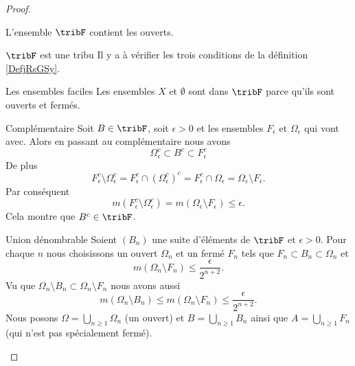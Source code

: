 \begin{proof}
\begin{subproof}
                L'ensemble \( \tribF\) contient les ouverts.

            \item[\( \tribF\) est une tribu]
                Il y a à vérifier les trois conditions de la définition \ref{DefjRsGSy}.
                \begin{subproof}
                \item[Les ensembles faciles]
                    Les ensembles \( X\) et \( \emptyset\) sont dans \( \tribF\) parce qu'ils sont ouverts et fermés.
                \item[Complémentaire]
                    Soit \( B\in \tribF\), soit \( \epsilon>0\) et les ensembles \( F_{\epsilon} \) et \( \Omega_{\epsilon}\) qui vont avec. Alors en passant au complémentaire nous avons
                    \begin{equation}
                        \Omega_{\epsilon}^c\subset B^c\subset F_{\epsilon}^c
                    \end{equation}
                    De plus
                    \begin{equation}
                        F_{\epsilon}^c\setminus \Omega_{\epsilon}^c=F_{\epsilon}^c\cap(\Omega_{\epsilon}^c)^c=F_{\epsilon}^c\cap \Omega_{\epsilon}=\Omega_{\epsilon}\setminus F_{\epsilon}.
                    \end{equation}
                    Par conséquent
                    \begin{equation}
                        m(F_{\epsilon}^c\setminus \Omega_{\epsilon}^c)=m(\Omega_{\epsilon}\setminus F_{\epsilon})\leq \epsilon.
                    \end{equation}
                    Cela montre que \( B^c\in \tribF\).
                \item[Union dénombrable]
                    Soient \( (B_n)\) une suite d'éléments de \( \tribF\) et \( \epsilon>0\). Pour chaque \( n\) nous choisissons un ouvert \( \Omega_n\) et un fermé \( F_n\) tels que \( F_n\subset  B_n\subset \Omega_n\) et 
                    \begin{equation}
                        m(\Omega_n\setminus F_n)\leq \frac{ \epsilon }{ 2^{n+2} }.
                    \end{equation}
                    Vu que \( \Omega_n\setminus B_n\subset \Omega_n\setminus F_n\) nous avons aussi
                    \begin{equation}
                        m(\Omega_n\setminus B_n)\leq m(\Omega_n\setminus F_n)\leq \frac{ \epsilon }{ 2^{n+2} }.
                    \end{equation}
                    Nous posons \( \Omega=\bigcup_{n\geq 1}\Omega_n\) (un ouvert) et \( B=\bigcup_{n\geq 1}B_n\) ainsi que \( A=\bigcup_{n\geq 1}F_n\) (qui n'est pas spécialement fermé).


\end{subproof}
\end{subproof}
\end{proof}
